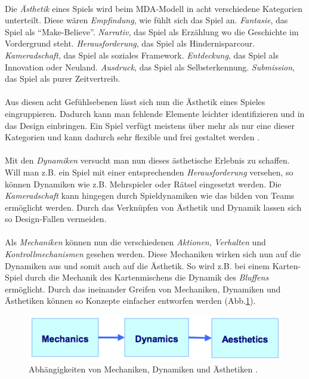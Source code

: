 \documentclass[a4paper,12pt]{scrartcl}
\begin{document}
\\
Die \textit{Ästhetik} eines Spiels wird beim MDA-Modell in acht verschiedene Kategorien unterteilt. Diese wären \textit{Empfindung}, wie fühlt sich das Spiel an. \textit{Fantasie}, das Spiel als \enquote{Make-Believe}. \textit{Narrativ}, das Spiel als Erzählung wo die Geschichte im Vordergrund steht. \textit{Herausforderung}, das Spiel als Hindernisparcour. \textit{Kameradschaft}, das Spiel als soziales Framework. \textit{Entdeckung}, das Spiel als Innovation oder Neuland. \textit{Ausdruck}, das Spiel als Selbsterkennung. \textit{Submission}, das Spiel als purer Zeitvertreib.
\\\\
Aus diesen acht Gefühlsebenen lässt sich nun die Ästhetik eines Spieles eingruppieren. Dadurch kann man fehlende Elemente leichter identifizieren und in das Design einbringen. Ein Spiel verfügt meistens über mehr als nur eine dieser Kategorien und kann dadurch sehr flexible und frei gestaltet werden \cite{Hunicke2004}.
\\\\
Mit den \textit{Dynamiken} versucht man nun dieses ästhetische Erlebnis zu schaffen. Will man z.B. ein Spiel mit einer entsprechenden \textit{Herausforderung} versehen, so können Dynamiken wie z.B. Mehrspieler oder Rätsel eingesetzt werden. Die \textit{Kameradschaft} kann hingegen durch Spieldynamiken wie das bilden von Teams ermöglicht werden. Durch das Verknüpfen von Ästhetik und Dynamik lassen sich so Design-Fallen vermeiden.
\\\\
Als \textit{Mechaniken} können nun die verschiedenen \textit{Aktionen}, \textit{Verhalten} und \textit{Kontrollmechanismen} gesehen werden. Diese Mechaniken wirken sich nun auf die Dynamiken aus und somit auch auf die Ästhetik. So wird z.B. bei einem Karten-Spiel durch die Mechanik des Kartenmischens die Dynamik des \textit{Bluffens} ermöglicht. Durch das ineinander Greifen von Mechaniken, Dynamiken und Ästhetiken können so Konzepte einfacher entworfen werden (Abb.\ref{MDABild}). 
\begin{figure}[h!]
\begin{center}
\includegraphics[scale = 1.0]{Bilder/MDA.eps}
\caption{Abhängigkeiten von Mechaniken, Dynamiken und Ästhetiken \cite{Hunicke2004}.}
\label{MDABild}
\end{center}
\end{figure}
\end{document}
